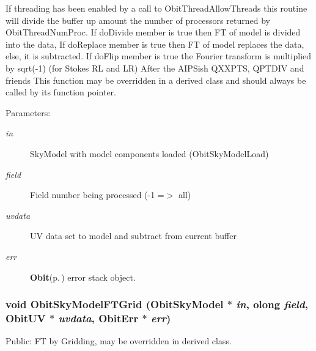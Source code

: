 If threading has been enabled by a call to Obit\-Thread\-Allow\-Threads this routine will divide the buffer up amount the number of processors returned by Obit\-Thread\-Num\-Proc. If do\-Divide member is true then FT of model is divided into the data, If do\-Replace member is true then FT of model replaces the data, else, it is subtracted. If do\-Flip member is true the Fourier transform is multiplied by sqrt(-1) (for Stokes RL and LR) After the AIPSish QXXPTS, QPTDIV and friends This function may be overridden in a derived class and should always be called by its function pointer. \begin{Desc}
\item[Parameters:]
\begin{description}
\item[{\em in}]Sky\-Model with model components loaded (Obit\-Sky\-Model\-Load) \item[{\em field}]Field number being processed (-1 =$>$ all) \item[{\em uvdata}]UV data set to model and subtract from current buffer \item[{\em err}]{\bf Obit}{\rm (p.\,\pageref{structObit})} error stack object. \end{description}
\end{Desc}
\subsubsection{\setlength{\rightskip}{0pt plus 5cm}void Obit\-Sky\-Model\-FTGrid ({\bf Obit\-Sky\-Model} $\ast$ {\em in}, {\bf olong} {\em field}, {\bf Obit\-UV} $\ast$ {\em uvdata}, {\bf Obit\-Err} $\ast$ {\em err})}\label{ObitSkyModel_8h_a66}


Public: FT by Gridding, may be overridden in derived class. 

